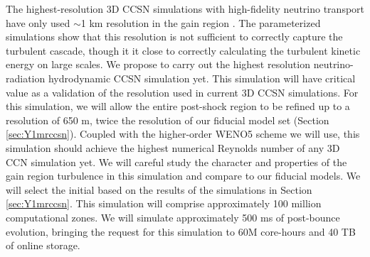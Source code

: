 The highest-resolution 3D CCSN simulations with high-fidelity neutrino transport have only used $\sim$1 km resolution in the gain region \citep{Roberts:2016, OConnor:2017}.
The parameterized simulations \citet{Radice:2016} show that this resolution is not sufficient to correctly capture the turbulent cascade, though it it close to correctly calculating the turbulent kinetic energy on large scales.
We propose to carry out the highest resolution neutrino-radiation hydrodynamic CCSN simulation yet.
This simulation will have critical value as a validation of the resolution used in current 3D CCSN simulations.
For this simulation, we will allow the entire post-shock region to be refined up to a resolution of 650 m, twice the resolution of our fiducial model set (Section \ref{sec:Y1mrccsn}).
Coupled with the higher-order WENO5 scheme we will use, this simulation should achieve the highest numerical Reynolds number of any 3D CCN simulation yet.
We will careful study the character and properties of the gain region turbulence in this simulation and compare to our fiducial models.
We will select the initial based on the results of the simulations in Section \ref{sec:Y1mrccsn}.
This simulation will comprise approximately 100 million computational zones.
We will simulate approximately 500 ms of post-bounce evolution, bringing the request for this simulation to 60M core-hours and 40 TB of online storage.

